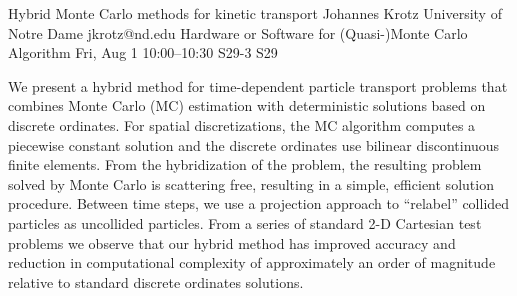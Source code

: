 \documentclass[12pt,lettersize,oneside]{book} %
\begin{document}
\begin{talk}


\end{talk}

\begin{talk}
  {Hybrid Monte Carlo methods for kinetic transport}%
  {Johannes Krotz}%
  {University of Notre Dame}%
  {jkrotz@nd.edu}%
  {Hardware or Software for (Quasi-)Monte Carlo Algorithm}%
  {}%
  {Fri, Aug 1 10:00--10:30}%
  {S29-3}%
  {S29}%
    
   

We present a hybrid method for time-dependent particle transport problems that combines Monte Carlo (MC) estimation with deterministic solutions based on discrete ordinates. For spatial discretizations, the MC algorithm computes a piecewise constant solution and the discrete ordinates use bilinear discontinuous finite elements. From the hybridization of the problem, the resulting problem solved by Monte Carlo is scattering free, resulting in a simple, efficient solution procedure. Between time steps, we use a projection approach to “relabel” collided particles as uncollided particles. From a series of standard 2-D Cartesian test problems we observe that our hybrid method has improved accuracy and reduction in computational complexity of approximately an order of magnitude relative to standard discrete ordinates solutions.

\end{talk}
\end{document}
